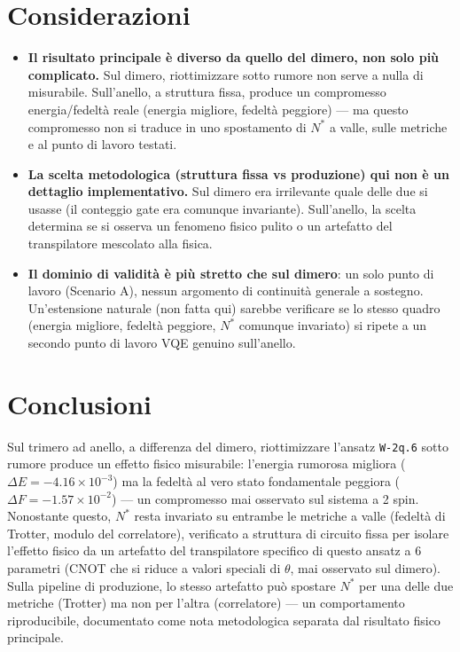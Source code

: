 \documentclass[11pt,a4paper]{article}
\begin{document}
\section{Considerazioni}

\begin{itemize}
  \item \textbf{Il risultato principale è diverso da quello del dimero, non solo più complicato.}
  Sul dimero, riottimizzare sotto rumore non serve a nulla di misurabile. Sull'anello, a struttura
  fissa, produce un compromesso energia/fedeltà reale (energia migliore, fedeltà peggiore) --- ma
  questo compromesso non si traduce in uno spostamento di $N^*$ a valle, sulle metriche e al punto
  di lavoro testati.
  \item \textbf{La scelta metodologica (struttura fissa vs produzione) qui non è un dettaglio
  implementativo.} Sul dimero era irrilevante quale delle due si usasse (il conteggio gate era
  comunque invariante). Sull'anello, la scelta determina se si osserva un fenomeno fisico pulito
  o un artefatto del transpilatore mescolato alla fisica.
  \item \textbf{Il dominio di validità è più stretto che sul dimero}: un solo punto di lavoro
  (Scenario A), nessun argomento di continuità generale a sostegno. Un'estensione naturale (non
  fatta qui) sarebbe verificare se lo stesso quadro (energia migliore, fedeltà peggiore, $N^*$
  comunque invariato) si ripete a un secondo punto di lavoro VQE genuino sull'anello.
\end{itemize}

\section{Conclusioni}

Sul trimero ad anello, a differenza del dimero, riottimizzare l'ansatz \texttt{W-2q.6} sotto
rumore produce un effetto fisico misurabile: l'energia rumorosa migliora
($\Delta E=-4.16\times10^{-3}$) ma la fedeltà al vero stato fondamentale peggiora
($\Delta F=-1.57\times10^{-2}$) --- un compromesso mai osservato sul sistema a 2 spin. Nonostante
questo, $N^*$ resta invariato su entrambe le metriche a valle (fedeltà di Trotter, modulo del
correlatore), verificato a struttura di circuito fissa per isolare l'effetto fisico da un
artefatto del transpilatore specifico di questo ansatz a 6 parametri (CNOT che si riduce a valori
speciali di $\theta$, mai osservato sul dimero). Sulla pipeline di produzione, lo stesso artefatto
può spostare $N^*$ per una delle due metriche (Trotter) ma non per l'altra (correlatore) --- un
comportamento riproducibile, documentato come nota metodologica separata dal risultato fisico
principale.
\end{document}
